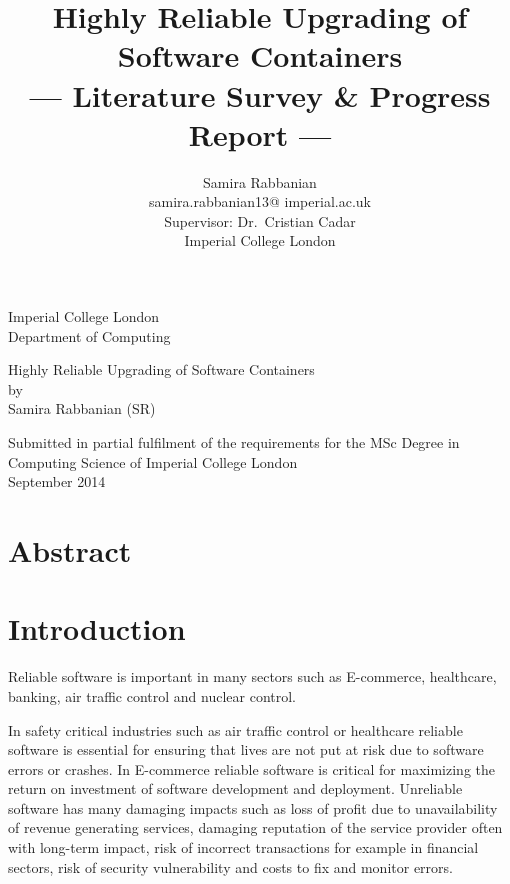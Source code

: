 \documentclass[a4paper,11pt,twoside]{article}
\title{Highly Reliable Upgrading of Software Containers\\\Large{--- Literature Survey \& Progress Report ---}}
\author{Samira Rabbanian\\
  samira.rabbanian13@ imperial.ac.uk \\
  \small{Supervisor: Dr.\ Cristian Cadar}\\
  \small{Imperial College London}}
\begin{document}
\maketitle


\begin{titlepage}
    \begin{center}
        \vspace*{2cm}
        
        \large
        {Imperial College London}\\
        \large
         \vspace*{0.5cm}
        {Department of Computing}
        
        \vspace{4.5 cm}
        \large
        {Highly Reliable Upgrading of Software Containers}\\
        {by}\\
        {Samira Rabbanian (SR)}
        
        \vspace{4.5cm}
        

  	\large {Submitted in partial fulfilment of the requirements for the MSc Degree in Computing Science of Imperial College London }\\
  	
\vspace*{1.5 cm}  	
  \large{September 2014}\\ 
           
    \end{center}
\end{titlepage}

\tableofcontents
\clearpage
\section{Abstract}

\clearpage
\section{Introduction}

Reliable software is important in many sectors such as E-commerce, healthcare, banking, air traffic control and nuclear control.

In safety critical industries such as air traffic control or healthcare reliable software is essential for ensuring that lives are not put at risk due to software errors or crashes. In E-commerce reliable software is critical for maximizing the return on investment of software development and deployment. Unreliable software has many damaging impacts such as loss of profit due to unavailability of revenue generating services, damaging reputation of the service provider often with long-term impact, risk of incorrect transactions for example in financial sectors, risk of security vulnerability and costs to fix and monitor errors.
\end{document}
